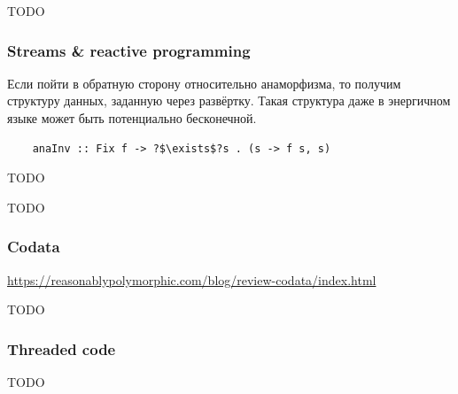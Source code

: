 
TODO %

\subsubsection{Streams \& reactive programming}

Если пойти в обратную сторону относительно анаморфизма, то получим структуру данных, заданную через развёртку.
Такая структура даже в энергичном языке может быть потенциально бесконечной.
\begin{verbatim}
    anaInv :: Fix f -> ?$\exists$?s . (s -> f s, s)
\end{verbatim}

TODO\cite{coutts2007stream, kiselyov2022highest} %





TODO %

\subsubsection{Codata}

\url{https://reasonablypolymorphic.com/blog/review-codata/index.html}



TODO~\cite{downen2019codata} %

\subsubsection{Threaded code}

TODO %

